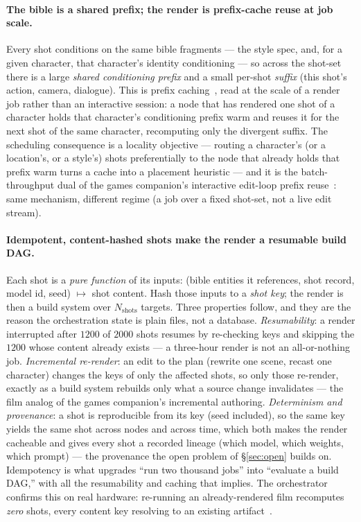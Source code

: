 \documentclass[11pt]{article}
\newcommand{\Nshots}{\ensuremath{N_{\mathrm{shots}}}}
\begin{document}
\paragraph{The bible is a shared prefix; the render is prefix-cache reuse at job scale.} Every shot conditions on
the same bible fragments --- the style spec, and, for a given character, that character's identity conditioning ---
so across the shot-set there is a large \emph{shared conditioning prefix} and a small per-shot \emph{suffix} (this
shot's action, camera, dialogue). This is prefix caching~\cite{latency}, read at the scale of a render job rather
than an interactive session: a node that has rendered one shot of a character holds that character's conditioning
prefix warm and reuses it for the next shot of the same character, recomputing only the divergent suffix. The
scheduling consequence is a locality objective --- routing a character's (or a location's, or a style's) shots
preferentially to the node that already holds that prefix warm turns a cache into a placement heuristic --- and it
is the batch-throughput dual of the games companion's interactive edit-loop prefix reuse~\cite{games}: same
mechanism, different regime (a job over a fixed shot-set, not a live edit stream).

\paragraph{Idempotent, content-hashed shots make the render a resumable build DAG.} Each shot is a
\emph{pure function} of its inputs: (bible entities it references, shot record, model id, seed)
$\mapsto$ shot content. Hash those inputs to a \emph{shot key}; the render is then a build system over
$\Nshots$ targets. Three properties follow, and they are the reason the orchestration state is plain files, not a
database. \emph{Resumability}: a render interrupted after $1200$ of $2000$ shots resumes by re-checking keys and
skipping the $1200$ whose content already exists --- a three-hour render is not an all-or-nothing job. \emph{Incremental re-render}: an edit to the plan (rewrite one scene, recast one character) changes the keys of only
the affected shots, so only those re-render, exactly as a build system rebuilds only what a source change
invalidates --- the film analog of the games companion's incremental authoring. \emph{Determinism and provenance}:
a shot is reproducible from its key (seed included), so the same key yields the same shot across nodes and across
time, which both makes the render cacheable and gives every shot a recorded lineage (which model, which weights,
which prompt) --- the provenance the open problem of \S\ref{sec:open} builds on. Idempotency is what upgrades
``run two thousand jobs'' into ``evaluate a build DAG,'' with all the resumability and caching that implies. The
orchestrator confirms this on real hardware: re-running an already-rendered film recomputes \emph{zero} shots,
every content key resolving to an existing artifact~\cite{film}.
\end{document}
